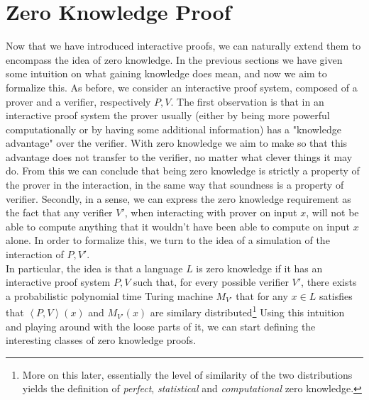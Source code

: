 \documentclass{article}
\begin{document}
\section{Zero Knowledge Proof}
Now that we have introduced interactive proofs, we can naturally extend them to encompass the idea of zero knowledge. In the previous sections we have given some intuition on what gaining knowledge does mean, and now we aim to formalize this. As before, we consider an interactive proof system, composed of a prover and a verifier, respectively $P, V$. The first observation is that in an interactive proof system the prover usually (either by being more powerful computationally or by having some additional information) has a "knowledge advantage" over the verifier. With zero knowledge we aim to make so that this advantage does not transfer to the verifier, no matter what clever things it may do. From this we can conclude that being zero knowledge is strictly a property of the prover in the interaction, in the same way that soundness is a property of verifier. Secondly, in a sense, we can express the zero knowledge requirement as the fact that any verifier $V'$, when interacting with prover on input $x$, will not be able to compute anything that it wouldn't have been able to compute on input $x$ alone. In order to formalize this, we turn to the idea of a simulation of the interaction of $P, V'$. \\
In particular, the idea is that a language $L$ is zero knowledge if it has an interactive proof system $P, V$ such that, for every possible verifier $V'$, there exists a probabilistic polynomial time Turing machine $M_{V'}$ that for any $x \in L$ satisfies that $\left<P, V\right>(x)$ and $M_{V'}(x)$ are similary distributed\footnote{More on this later, essentially the level of similarity of the two distributions yields the definition of \textit{perfect}, \textit{statistical} and \textit{computational} zero knowledge.}
Using this intuition and playing around with the loose parts of it, we can start defining the interesting classes of zero knowledge proofs. 
\end{document}
